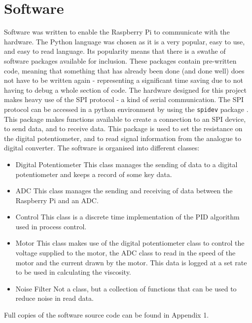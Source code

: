 \documentclass[twoside,a4]{report}
\def\br{\newline \newline \noindent}
\def\rpi{Raspberry Pi }
\begin{document}
	\section{Software} %
	Software was written to enable the \rpi to communicate with the hardware. The Python language was chosen as it is a very popular, easy to use, and easy to read language. Its popularity means that there is a swathe of software packages available for inclusion. These packages contain pre-written code, meaning that something that has already been done (and done well) does not have to be written again - representing a significant time saving due to not having to debug a whole section of code.\br
	The hardware designed for this project makes heavy use of the SPI protocol - a kind of serial communication. The SPI protocol can be accessed in a python environment by using the \texttt{spidev} package \cite{srcspidev}. This package makes functions available to create a connection to an SPI device, to send data, and to receive data. This package is used to set the resistance on the digital potentiometer, and to read signal information from the analogue to digital converter. \br
	The software is organised into different classes:
	\begin{itemize}
		\item Digital Potentiometer \newline 
		This class manages the sending of data to a digital potentiometer and keeps a record of some key data.
		\item ADC \newline 
		This class manages the sending and receiving of data between the \rpi and an ADC.
		\item Control\newline 
		This class is a discrete time implementation of the PID algorithm used in process control.
		\item Motor \newline
		This class makes use of the digital potentiometer class to control the voltage supplied to the motor, the ADC class to read in the speed of the motor and the current drawn by the motor. This data is logged at a set rate to be used in calculating the viscosity.
		\item Noise Filter \newline
		Not a class, but a collection of functions that can be used to reduce noise in read data.
	\end{itemize}
	Full copies of the software source code can be found in Appendix 1.
	
\end{document}
